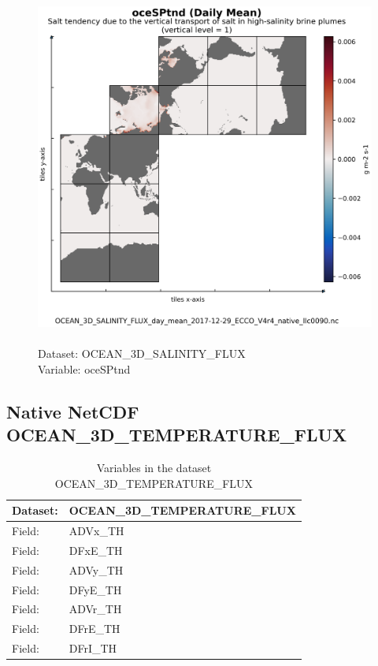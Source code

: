 \begin{figure}[H]
\centering
\includegraphics[scale=0.5]{../images/plots/native_plots/Ocean_Three-Dimensional_Salinity_Fluxes/oceSPtnd.png}
\caption{\\Dataset: OCEAN\_3D\_SALINITY\_FLUX\\Variable: oceSPtnd}
\label{tab:table-OCEAN_3D_SALINITY_FLUX_oceSPtnd-Plot}
\end{figure}
\pagebreak
\subsection{Native NetCDF OCEAN\_3D\_TEMPERATURE\_FLUX}
\newp
\begin{longtable}{|p{}|p{}|}
\caption{Variables in the dataset OCEAN\_3D\_TEMPERATURE\_FLUX}
\label{tab:table-OCEAN_3D_TEMPERATURE_FLUX-fields} \\ 
\hline \endhead \hline \endfoot
\rowcolor{lightgray} \textbf{Dataset:} & \textbf{OCEAN\_3D\_TEMPERATURE\_FLUX} \\ \hline
Field: &ADVx\_TH \\ \hline
Field: &DFxE\_TH \\ \hline
Field: &ADVy\_TH \\ \hline
Field: &DFyE\_TH \\ \hline
Field: &ADVr\_TH \\ \hline
Field: &DFrE\_TH \\ \hline
Field: &DFrI\_TH \\ \hline
\end{longtable}

